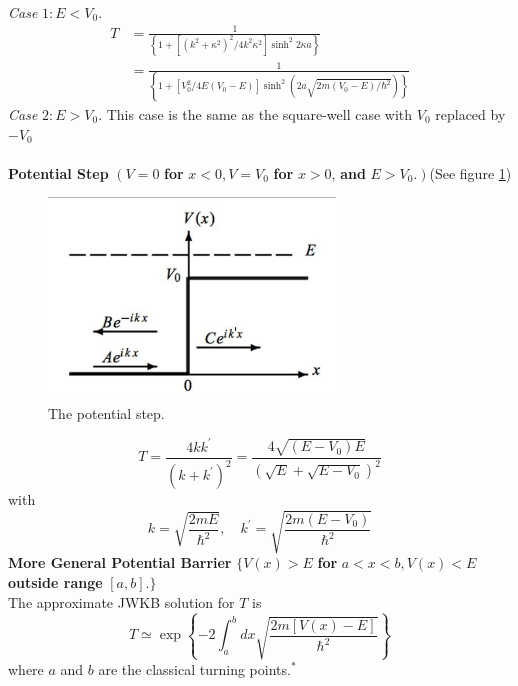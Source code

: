 \documentclass{article}
\begin{document}
\\
\textit{Case} $1: E<V_{0}$.
\begin{equation}
\begin{aligned}
T &=\frac{1}{\left\{1+\left[\left(k^{2}+\kappa^{2}\right)^{2} / 4 k^{2} \kappa^{2}\right] \sinh ^{2} 2 \kappa a\right\}} \\
&=\frac{1}{\left\{1+\left[V_{0}^{2} / 4 E\left(V_{0}-E\right)\right] \sinh ^{2}\left(2 a \sqrt{2 m\left(V_{0}-E\right) / \hbar^{2}}\right)\right\}}
\end{aligned}
\end{equation}
\textit{Case} $2: E>V_{0} .$ This case is the same as the square-well case with $V_{0}$ replaced by $-V_{0}$
\\
\\
\textbf{Potential Step} $\left(V=0\right.$ \textbf{for} $x<0, V=V_{0}$ \textbf{for} $x>0$, \textbf{and} $\left.E>V_{0} .\right)$(See figure \ref{fig5})
\begin{figure}[h]
    \centering
    \includegraphics[width=3.0in]{img5.jpg}
    \caption{The potential step.} \label{fig5}
\end{figure}


\begin{equation}
T=\frac{4 k k^{\prime}}{\left(k+k^{\prime}\right)^{2}}=\frac{4 \sqrt{\left(E-V_{0}\right) E}}{\left(\sqrt{E}+\sqrt{E-V_{0}}\right)^{2}}
\end{equation}
with
\begin{equation}
k=\sqrt{\frac{2 m E}{\hbar^{2}}}, \quad k^{\prime}=\sqrt{\frac{2 m\left(E-V_{0}\right)}{\hbar^{2}}}
\end{equation}
\textbf{More General Potential Barrier} $\{V(x)>E$ \textbf{for} $a<x<b, V(x)<E$ \textbf{outside range} $[a, b] .\}$
\\
The approximate JWKB solution for $T$ is
\begin{equation}
T \simeq \exp \left\{-2 \int_{a}^{b} d x \sqrt{\frac{2 m[V(x)-E]}{\hbar^{2}}}\right\}
\end{equation}
where $a$ and $b$ are the classical turning points.${ }^{*}$
\\
\\
\end{document}

